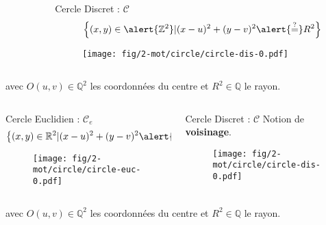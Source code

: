 \begin{frame}
{\begin{columns}[t]
\begin{column}{0.5\linewidth}
    \end{column}
    \begin{column}{0.5\linewidth}
      \begin{block}{Cercle Discret : $\mathcal{C}$}
        $$\left\{ (x,y) \in \alert{\mathbb{Z}^{2}} | (x - u)^2 + (y - v)^2 \alert{\stackrel{?}{=}} R^2 \right\}$$
        \vspace{-0.24cm}
        \begin{figure}[h!]
          \centering
          \texttt{[image: fig/2-mot/circle/circle-dis-0.pdf]}
        \end{figure}
      \end{block}  
    \end{column}
  \end{columns} 

  \begin{exampleblock}{}
  avec $O(u,v) \in \mathbb{Q}^{2}$ les coordonnées du centre et $R^2 \in \mathbb{Q}$ le rayon.\\
  \end{exampleblock}
}

{
  \begin{columns}[t]
    \begin{column}{0.5\linewidth}
      \begin{block}{Cercle Euclidien : $\mathcal{C}_e$}
        $$\left\{ (x,y) \in \mathbb{R}^{2} | (x - u)^2 + (y - v)^2 \alert{=} R^2 \right\}$$
        \begin{figure}[h!]
          \centering
          \texttt{[image: fig/2-mot/circle/circle-euc-0.pdf]}
        \end{figure}
      \end{block}
    
    \end{column}
    \begin{column}{0.5\linewidth}
      \begin{block}{Cercle Discret : $\mathcal{C}$}
        Notion de \textbf{voisinage}.
        \vspace{0.24cm}
        \begin{figure}[h!]
          \centering
          \texttt{[image: fig/2-mot/circle/circle-dis-0.pdf]}
        \end{figure}
      \end{block}  
    \end{column}
  \end{columns} 

  \begin{exampleblock}{}
  avec $O(u,v) \in \mathbb{Q}^{2}$ les coordonnées du centre et $R^2 \in \mathbb{Q}$ le rayon.\\
  \end{exampleblock}
}
\end{frame}

